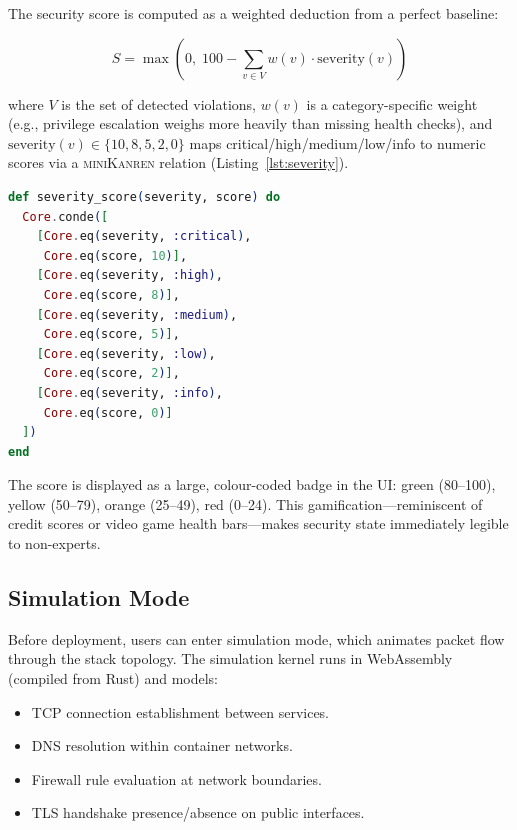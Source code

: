 \documentclass[11pt,twocolumn]{article}
\newcommand{\minikanren}{\textsc{miniKanren}\xspace}
\begin{document}
The security score is computed as a weighted deduction from a perfect
baseline:

\begin{equation}
\label{eq:score}
S = \max\!\left(0,\; 100 - \sum_{v \in V} w(v) \cdot \text{severity}(v)\right)
\end{equation}

where $V$ is the set of detected violations, $w(v)$ is a
category-specific weight (e.g., privilege escalation weighs more
heavily than missing health checks), and $\text{severity}(v) \in
\{10, 8, 5, 2, 0\}$ maps critical/high/medium/low/info to numeric
scores via a \minikanren relation (Listing~\ref{lst:severity}).

\begin{lstlisting}[language=Elixir,caption={Severity scoring as a
\minikanren relation in Elixir.},label=lst:severity]
def severity_score(severity, score) do
  Core.conde([
    [Core.eq(severity, :critical),
     Core.eq(score, 10)],
    [Core.eq(severity, :high),
     Core.eq(score, 8)],
    [Core.eq(severity, :medium),
     Core.eq(score, 5)],
    [Core.eq(severity, :low),
     Core.eq(score, 2)],
    [Core.eq(severity, :info),
     Core.eq(score, 0)]
  ])
end
\end{lstlisting}

The score is displayed as a large, colour-coded badge in the UI:
green (80--100), yellow (50--79), orange (25--49), red (0--24). This
gamification---reminiscent of credit scores or video game health
bars---makes security state immediately legible to non-experts.

\subsection{Simulation Mode}
\label{sec:gap-simulation}

Before deployment, users can enter simulation mode, which animates
packet flow through the stack topology. The simulation kernel runs in
WebAssembly (compiled from Rust) and models:

\begin{itemize}[leftmargin=*]
\item TCP connection establishment between services.
\item DNS resolution within container networks.
\item Firewall rule evaluation at network boundaries.
\item TLS handshake presence/absence on public interfaces.
\end{itemize}
\end{document}
